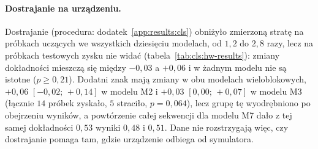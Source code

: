 \paragraph{Dostrajanie na urządzeniu.}
Dostrajanie (procedura: dodatek~\ref{app:results:cls}) obniżyło zmierzoną stratę na próbkach uczących we wszystkich dziesięciu modelach, od $1{,}2$ do $2{,}8$ razy, lecz na próbkach testowych zysku nie widać (tabela~\ref{tab:cls:hw-results}): zmiany dokładności mieszczą się między $-0{,}03$ a $+0{,}06$ i w żadnym modelu nie są istotne ($p\geq 0{,}21$).
Dodatni znak mają zmiany w obu modelach wieloblokowych, $+0{,}06$ $[-0{,}02;\,+0{,}14]$ w modelu M2 i $+0{,}03$ $[0{,}00;\,+0{,}07]$ w modelu M3 (łącznie $14$ próbek zyskało, $5$ straciło, $p=0{,}064$), lecz grupę tę wyodrębniono po obejrzeniu wyników, a powtórzenie całej sekwencji dla modelu M7 dało z tej samej dokładności $0{,}53$ wyniki $0{,}48$ i $0{,}51$.
Dane nie rozstrzygają więc, czy dostrajanie pomaga tam, gdzie urządzenie odbiega od symulatora.

